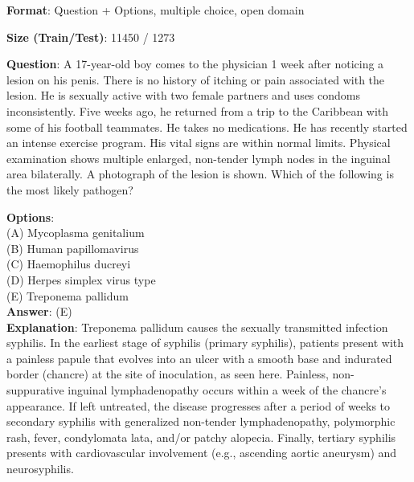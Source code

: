 \documentclass{article}
\begin{document}
\begin{myboxnote}[MedQA]

\textbf{Format}: Question + Options, multiple choice, open domain

\textbf{Size (Train/Test)}: 11450 / 1273

\tcblower

\textbf{Question}: A 17-year-old boy comes to the physician 1 week after noticing a lesion on his penis. There is no history of itching or pain associated with the lesion. He is sexually active with two female partners and uses condoms inconsistently. Five weeks ago, he returned from a trip to the Caribbean with some of his football teammates. He takes no medications. He has recently started an intense exercise program. His vital signs are within normal limits. Physical examination shows multiple enlarged, non-tender lymph nodes in the inguinal area bilaterally. A photograph of the lesion is shown. Which of the following is the most likely pathogen?

\textbf{Options}: \\
(A) Mycoplasma genitalium \\
(B) Human papillomavirus \\
(C) Haemophilus ducreyi \\
(D) Herpes simplex virus type \\
(E) Treponema pallidum \\

\textbf{Answer}: (E) \\
\textbf{Explanation}: Treponema pallidum causes the sexually transmitted infection syphilis. In the earliest stage of syphilis (primary syphilis), patients present with a painless papule that evolves into an ulcer with a smooth base and indurated border (chancre) at the site of inoculation, as seen here. Painless, non-suppurative inguinal lymphadenopathy occurs within a week of the chancre's appearance. If left untreated, the disease progresses after a period of weeks to secondary syphilis with generalized non-tender lymphadenopathy, polymorphic rash, fever, condylomata lata, and/or patchy alopecia. Finally, tertiary syphilis presents with cardiovascular involvement (e.g., ascending aortic aneurysm) and neurosyphilis.

\end{myboxnote}
\end{document}
